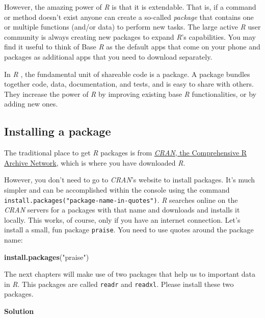 \documentclass[
]{scrartcl}
\makeatletter
\newenvironment{Shaded}{\begin{snugshade}}{\end{snugshade}}
\newcommand{\FunctionTok}[1]{\textcolor[rgb]{0.13,0.29,0.53}{\textbf{#1}}}
\newcommand{\NormalTok}[1]{#1}
\newcommand{\StringTok}[1]{\textcolor[rgb]{0.31,0.60,0.02}{#1}}
\newenvironment{kframe}{%
\medskip{}
\setlength{\fboxsep}{.8em}
 \def\at@end@of@kframe{}%
 \ifinner\ifhmode%
  \def\at@end@of@kframe{\end{minipage}}%
  \begin{minipage}{\columnwidth}%
 \fi\fi%
 \def\FrameCommand##1{\hskip\@totalleftmargin \hskip-\fboxsep
 \colorbox{shadecolor}{##1}\hskip-\fboxsep
     \hskip-\linewidth \hskip-\@totalleftmargin \hskip\columnwidth}%
 \MakeFramed {\advance\hsize-\width
   \@totalleftmargin\z@ \linewidth\hsize
   \@setminipage}}%
 {\par\unskip\endMakeFramed%
 \at@end@of@kframe}
\newenvironment{rmdblock}[1]
  {
  \begin{itemize}
  \renewcommand{\labelitemi}{
    \raisebox{-.7\height}[0pt][0pt]{
      {\setkeys{Gin}{width=3em,keepaspectratio}\texttt{[image: images/\#1]}}
    }
  }
  \setlength{\fboxsep}{1em}
  \begin{kframe}
  \item
  }
  {
  \end{kframe}
  \end{itemize}
  }
\newenvironment{myexercise}
    {\begin{rmdblock}{exercise_green}}
    {\end{rmdblock}}
\newenvironment{webexsolution}[1]
    {\par\tiny\textbf{#1}}
    {\par}
\newcommand{\webexhide}[1]{\begin{webexsolution}{#1}}
\makeatother
\begin{document}
However, the amazing power of \emph{R} is that it is extendable. That is, if a command or method doesn't exist anyone can create a so-called \emph{package} that contains one or multiple functions (and/or data) to perform new tasks. The large active \emph{R} user community is always creating new packages to expand \emph{R}'s capabilities. You may find it useful to think of Base \emph{R} as the default apps that come on your phone and packages as additional apps that you need to download separately.

In \emph{R} , the fundamental unit of shareable code is a package. A package bundles together code, data, documentation, and tests, and is easy to share with others. They increase the power of \emph{R} by improving existing base \emph{R} functionalities, or by adding new ones.

\subsection{Installing a package}\label{installing-a-package}

The traditional place to get \emph{R} packages is from \href{https://cran.r-project.org/}{\emph{CRAN}, the Comprehensive R Archive Network}, which is where you have downloaded \emph{R}.

However, you don't need to go to \emph{CRAN}'s website to install packages. It's much simpler and can be accomplished within the console using the command \texttt{install.packages("package-name-in-quotes")}. \emph{R} searches online on the \emph{CRAN} servers for a packages with that name and downloads and installs it locally. This works, of course, only if you have an internet connection. Let's install a small, fun package \texttt{praise}. You need to use quotes around the package name:

\begin{Shaded}
\begin{Highlighting}[]
\FunctionTok{install.packages}\NormalTok{(}\StringTok{"praise"}\NormalTok{)}
\end{Highlighting}
\end{Shaded}

\begin{myexercise}
The next chapters will make use of two packages that help us to
important data in \emph{R}. This packages are called \texttt{readr} and
\texttt{readxl}. Please install these two packages.
\end{myexercise}
\webexhide{Solution}
\end{document}

